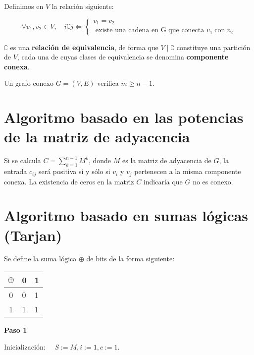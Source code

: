 \documentclass[openany]{book}
\begin{document}
Definimos en $V$ la relación siguiente:

$$
\forall v_{1}, v_{2} \in V, \quad i \complement j \Leftrightarrow\left\{\begin{array}{l}
v_{1}=v_{2} \\
\text { existe una cadena en } \mathrm{G} \text { que conecta } v_{1} \operatorname{con} v_{2}
\end{array}\right.
$$

$\complement$ es una \textbf{relación de equivalencia}, de forma que $V \mid \complement$ constituye una partición de $V$, cada una de cuyas clases de equivalencia se denomina \textbf{componente conexa}.

\begin{proposition}
  Un grafo conexo $G=(V, E)$ verifica $m \geq n-1$.

\end{proposition}

\section{Algoritmo basado en las potencias de la matriz de adyacencia}

Si se calcula $C=\sum_{k=1}^{n-1} M^{k}$, donde $M$ es la matriz de adyacencia de $G$, la entrada $c_{i j}$ será positiva si y sólo si $v_{i}$ y $v_{j}$ pertenecen a la misma componente conexa. La existencia de ceros en la matriz $C$ indicaría que $G$ no es conexo.

\section{Algoritmo basado en sumas lógicas (Tarjan)}


Se define la suma lógica $\oplus$ de bits de la forma siguiente:

\begin{center}
  \begin{tabular}{|c|ll|}
  \hline$\oplus$ & 0 & 1 \\
  \hline 0 & 0 & 1 \\
  1 & 1 & 1 \\
  \hline
  \end{tabular}

\end{center}

\begin{center}
  \textbf{Paso 1}
\end{center}

Inicialización: $\quad S:=M, i:=1, c:=1$.
\end{document}
